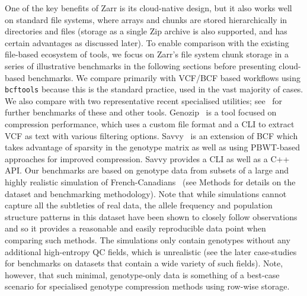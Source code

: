 \documentclass[a4paper,num-refs]{oup-contemporary}
\begin{document}
One of the key benefits of Zarr is its cloud-native design,
but it also works well on standard file systems, where
arrays and chunks are stored hierarchically in directories
and files (storage as a single Zip archive is also supported,
and has certain advantages as discussed later).
To enable comparison with the existing file-based ecosystem
of tools, we focus on Zarr's file system chunk storage in a series of illustrative
benchmarks in the following sections before presenting cloud-based benchmarks.
We compare primarily with
VCF/BCF based workflows using \texttt{bcftools} because this
is the standard practice, used in the vast majority of cases.
We also compare with two representative recent specialised utilities;
see~\cite{danek2018gtc,zhang2023gbc,luo2024gsc} for further benchmarks of
these and other tools.
Genozip~\cite{lan2020genozip,lan2021genozip} is a tool focused
on compression performance, which uses a custom file format
and a CLI to extract VCF as text with various filtering options.
Savvy~\cite{lefaive2021sparse} is an extension of BCF which
takes advantage of sparsity in the genotype matrix as well
as using PBWT-based approaches for improved compression.
Savvy provides a CLI as well as a C++ API.
Our benchmarks are based on genotype data
from subsets of a large and highly realistic
simulation of French-Canadians~\cite{anderson2023on}
(see Methods for details on the dataset and benchmarking methodology).
Note that while simulations cannot capture
all the subtleties of real data, the allele frequency
and population structure patterns in this dataset
have been shown to closely follow
observations~\cite{anderson2023on} and so it provides
a reasonable and easily reproducible data point
when comparing such methods.
The simulations only contain genotypes without any additional
high-entropy QC fields, which is unrealistic
(see the later case-studies
for benchmarks on datasets that contain a wide variety
of such fields).
Note, however, that such minimal, genotype-only data
is something of a best-case scenario for specialised genotype
compression methods using row-wise storage.
\end{document}
